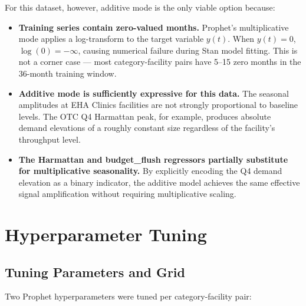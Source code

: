 \documentclass[12pt, a4paper]{article}
\begin{document}
For this dataset, however, additive mode is the only viable option
because:

\begin{itemize}[leftmargin=1.5em, itemsep=4pt]
  \item \textbf{Training series contain zero-valued months.} Prophet's
        multiplicative mode applies a log-transform to the target variable
        $y(t)$. When $y(t) = 0$, $\log(0) = -\infty$, causing numerical
        failure during Stan model fitting. This is not a corner case ---
        most category-facility pairs have 5--15 zero months in the
        36-month training window.

  \item \textbf{Additive mode is sufficiently expressive for this data.}
        The seasonal amplitudes at EHA Clinics facilities are not strongly
        proportional to baseline levels. The OTC Q4 Harmattan peak, for
        example, produces absolute demand elevations of a roughly constant
        size regardless of the facility's throughput level.

  \item \textbf{The Harmattan and budget\_flush regressors partially
        substitute for multiplicative seasonality.} By explicitly encoding
        the Q4 demand elevation as a binary indicator, the additive model
        achieves the same effective signal amplification without requiring
        multiplicative scaling.
\end{itemize}

\section{Hyperparameter Tuning}

\subsection{Tuning Parameters and Grid}

Two Prophet hyperparameters were tuned per category-facility pair:
\end{document}

